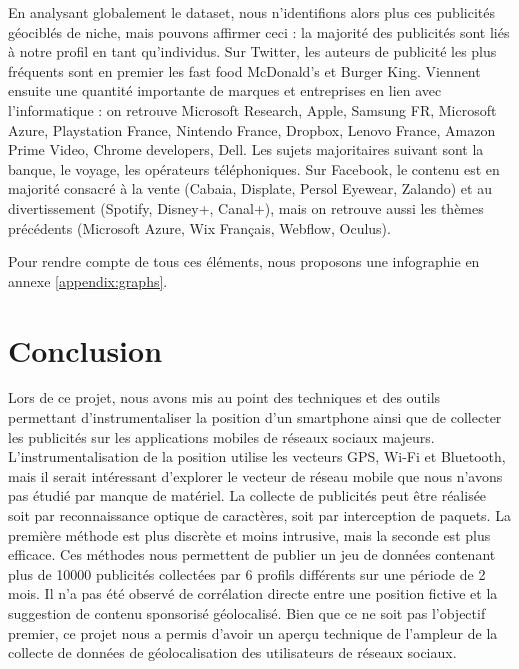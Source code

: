 \documentclass[runningheads]{llncs}
\begin{document}
En analysant globalement le dataset, nous n'identifions alors plus ces publicités géociblés de niche, mais pouvons affirmer ceci : la majorité des publicités sont liés à notre profil en tant qu'individus. Sur Twitter, les auteurs de publicité les plus fréquents sont en premier les fast food McDonald's et Burger King. Viennent ensuite une quantité importante de marques et entreprises en lien avec l'informatique : on retrouve Microsoft Research, Apple, Samsung FR, Microsoft Azure, Playstation France, Nintendo France, Dropbox, Lenovo France, Amazon Prime Video, Chrome developers, Dell. Les sujets majoritaires suivant sont la banque, le voyage, les opérateurs téléphoniques.
Sur Facebook, le contenu est en majorité consacré à la vente (Cabaia, Displate, Persol Eyewear, Zalando) et au divertissement (Spotify, Disney+, Canal+), mais on retrouve aussi les thèmes précédents (Microsoft Azure, Wix Français, Webflow, Oculus).

Pour rendre compte de tous ces éléments, nous proposons une infographie en annexe \ref{appendix:graphs}.

\section{Conclusion}\label{conclusion}

Lors de ce projet, nous avons mis au point des techniques et des outils permettant d'instrumentaliser la position d'un smartphone ainsi que de collecter les publicités sur les applications mobiles de réseaux sociaux majeurs. 
L'instrumentalisation de la position utilise les vecteurs GPS, Wi-Fi et Bluetooth, mais il serait intéressant d'explorer le vecteur de réseau mobile que nous n'avons pas étudié par manque de matériel. 
La collecte de publicités peut être réalisée soit par reconnaissance optique de caractères, soit par interception de paquets. La première méthode est plus discrète et moins intrusive, mais la seconde est plus efficace. 
Ces méthodes nous permettent de publier un jeu de données contenant plus de 10000 publicités collectées par 6 profils différents sur une période de 2 mois.
Il n'a pas été observé de corrélation directe entre une position fictive et la suggestion de contenu sponsorisé géolocalisé.
Bien que ce ne soit pas l'objectif premier, ce projet nous a permis d'avoir un aperçu technique de l'ampleur de la collecte de données de géolocalisation des utilisateurs de réseaux sociaux.



\end{document}
